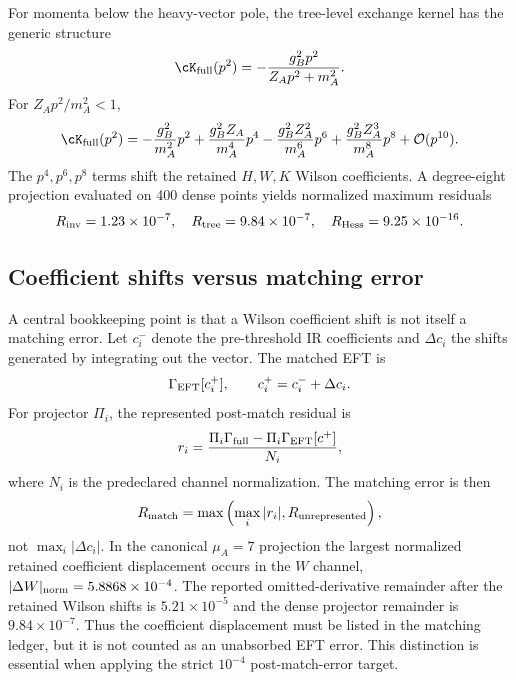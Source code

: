 \documentclass[12pt]{iopart}
\newcommand{\cO}{\mathcal O}
\begin{document}
For momenta below the heavy-vector pole, the tree-level exchange kernel has the generic structure
\begin{equation}
\cK_{\rm full}(p^2)=-\frac{g_B^2p^2}{Z_Ap^2+m_A^2}.
\label{eq:kernel}
\end{equation}
For $Z_Ap^2/m_A^2<1$,
\begin{equation}
\cK_{\rm full}(p^2)=
-\frac{g_B^2}{m_A^2}p^2
+\frac{g_B^2Z_A}{m_A^4}p^4
-\frac{g_B^2Z_A^2}{m_A^6}p^6
+\frac{g_B^2Z_A^3}{m_A^8}p^8
+\cO(p^{10}).
\label{eq:derivativeexpansion}
\end{equation}
The $p^4,p^6,p^8$ terms shift the retained $H,W,K$ Wilson coefficients.  A degree-eight projection evaluated on 400 dense points yields normalized maximum residuals
\begin{equation}
R_{\rm inv}=1.23\times10^{-7},\quad
R_{\rm tree}=9.84\times10^{-7},\quad
R_{\rm Hess}=9.25\times10^{-16}.
\label{eq:projectionres}
\end{equation}

\subsection{Coefficient shifts versus matching error}

A central bookkeeping point is that a Wilson coefficient shift is not itself a matching error.  Let $c_i^-$ denote the pre-threshold IR coefficients and $\Delta c_i$ the shifts generated by integrating out the vector.  The matched EFT is
\begin{equation}
\Gamma_{\rm EFT}[c_i^+],\qquad c_i^+=c_i^-+\Delta c_i.
\end{equation}
For projector $\Pi_i$, the represented post-match residual is
\begin{equation}
r_i=\frac{\Pi_i\Gamma_{\rm full}-\Pi_i\Gamma_{\rm EFT}[c^+]}{N_i},
\label{eq:rmatch}
\end{equation}
where $N_i$ is the predeclared channel normalization.  The matching error is then
\begin{equation}
R_{\rm match}=\max\left(\max_i|r_i|,R_{\rm unrepresented}\right),
\label{eq:Rmatch}
\end{equation}
not $\max_i|\Delta c_i|$.  In the canonical $\mu_A=7$ projection the largest normalized retained coefficient displacement occurs in the $W$ channel, $|\Delta W|_{\rm norm}=5.8868\times10^{-4}$.  The reported omitted-derivative remainder after the retained Wilson shifts is $5.21\times10^{-5}$ and the dense projector remainder is $9.84\times10^{-7}$.  Thus the coefficient displacement must be listed in the matching ledger, but it is not counted as an unabsorbed EFT error.  This distinction is essential when applying the strict $10^{-4}$ post-match-error target.
\end{document}
